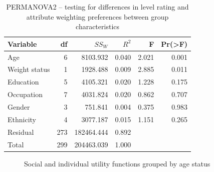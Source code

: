 \documentclass[
  number,
  preprint]{elsarticle}
\begin{document}
\begin{longtable}[]{@{}lrrrrr@{}}

\caption{\label{tbl-permanova2}PERMANOVA2 -- testing for differences in
level rating and attribute weighting preferences between group
characteristics}

\tabularnewline

\toprule\noalign{}
Variable & df & \(SS_W\) & \(R^2\) & F & Pr(\textgreater F) \\
\midrule\noalign{}
\endhead
\bottomrule\noalign{}
\endlastfoot
Age & 6 & 8103.932 & 0.040 & 2.021 & 0.001 \\
Weight status & 1 & 1928.488 & 0.009 & 2.885 & 0.011 \\
Education & 5 & 4105.321 & 0.020 & 1.228 & 0.175 \\
Occupation & 7 & 4031.824 & 0.020 & 0.862 & 0.707 \\
Gender & 3 & 751.841 & 0.004 & 0.375 & 0.983 \\
Ethnicity & 4 & 3077.187 & 0.015 & 1.151 & 0.265 \\
Residual & 273 & 182464.444 & 0.892 & & \\
Total & 299 & 204463.039 & 1.000 & & \\

\end{longtable}

\begin{figure}


\caption{\label{fig-age}Social and individual utility functions grouped
by age status}

\end{figure}%
\end{document}
